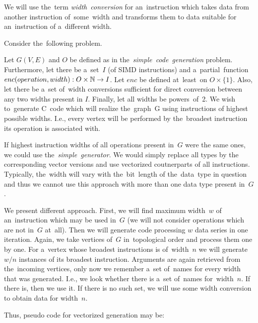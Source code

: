 \begin{define}
  We will use the~term \emph{width~conversion} for an~instruction which takes data from another instruction of~some~width and transforms them to data suitable for an~instruction of a~different width. 
\end{define}

Consider the~following problem.

\begin{problem}
  Let $G(V,E)$ and $O$ be defined as in the~\emph{simple~code~generation} problem. Furthermore, let there be a~set~$I$ (of SIMD instructions) and a~partial~function $enc (operation, width): O \times \mathbb{N} \rightarrow I$. Let $enc$ be defined at~least~on $O \times \{1\}$. Also, let there be a~set of~width conversions sufficient for direct conversion between any two widths present in $I$. Finally, let all widths be powers~of~2. We wish to~generate C~code which will realize the~graph~G using instructions of highest possible widths. I.e., every vertex will be performed by the~broadest instruction its operation is associated with. 
\end{problem}

If highest instruction widths of all operations present in~$G$ were the same ones, we could use the~\emph{simple~generator}. We would simply replace all types by the corresponding vector versions and use vectorized coutnerparts of all instructions. Typically, the~width will vary with the~bit~length of the~data~type in question and thus we cannot use this approach with more than one data type present in~$G$.

\parspace

We present different approach. First, we will find maximum width~$w$ of an~instruction which may be used in~$G$ (we will not consider operations which are not in~$G$ at~all). Then we will generate code processing $w$ data series in one iteration. Again, we take vertices of~$G$ in~topological order and process them one by one. For a~vertex whose broadest instructions is of~width~$n$ we will generate $w/n$ instances of its broadest instruction. Arguments are again retrieved from the~incoming vertices, only now we remember a~set of~names for every width that was generated. I.e., we look whether there is a~set of~names for~width~$n$. If there is, then we use it. If there is no such set, we will use some width conversion to obtain data for width~$n$. 

\parspace

Thus, pseudo code for vectorized generation may be:

